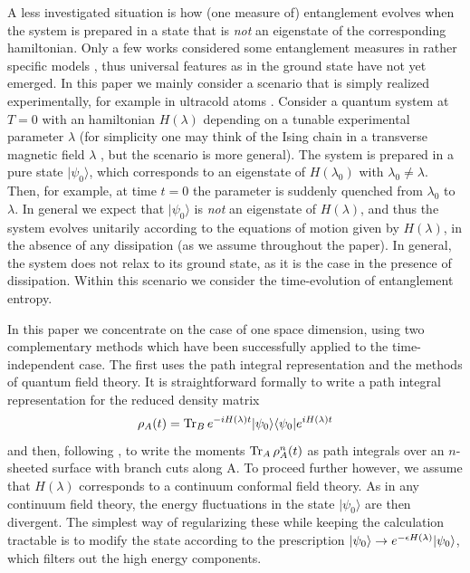 A less investigated situation is how (one measure of) entanglement evolves 
when the system is prepared in a state that is {\em not} an eigenstate of 
the corresponding hamiltonian.
Only a few works considered some entanglement measures in rather specific 
models \cite{outeq,dur}, thus universal features as in the ground state have 
not yet emerged. 
In this paper we mainly consider a scenario that is simply
realized experimentally, for example in ultracold atoms \cite{uc,sps-04}. 
Consider a quantum system at $T=0$ with an hamiltonian $H(\lambda)$ depending 
on a tunable experimental parameter $\lambda$ (for simplicity one may
think of the Ising chain in a transverse magnetic 
field $\lambda$ \cite{sach}, but the scenario is more general).
The system is prepared in a pure state $|\psi_0\rangle$,
which corresponds to an eigenstate of $H(\lambda_0)$ with 
$\lambda_0\neq \lambda$. Then, for example,
at time $t=0$ the parameter is suddenly quenched from 
$\lambda_0$ to $\lambda$. In general we expect that $|\psi_0\rangle$ 
is {\it not} an eigenstate of $H(\lambda)$, and thus the system evolves 
unitarily according to the equations of motion given by $H(\lambda)$, 
in the absence of any dissipation (as we assume throughout  the paper). 
In general, the system does not relax to its ground state,
as it is the case in the presence of dissipation.
Within this scenario we consider the time-evolution of 
entanglement entropy.




In this paper we concentrate on the case of one space dimension, using
two complementary methods which have been successfully applied to the
time-independent case. The first uses the path integral representation
and the methods of quantum field theory. It is straightforward formally to
write a path integral representation for the reduced density matrix
\begin{equation}
\rho_A(t)=
{\rm
Tr}_B\,e^{-iH(\lambda)t}|\psi_0\rangle\langle\psi_0|e^{iH(\lambda)t}
\end{equation}
and then, following \cite{cc-04}, to write the moments 
${\rm Tr}_A\,\rho_A^n(t)$ as path integrals over an $n$-sheeted surface with
branch cuts along A. To proceed further however, we assume that
$H(\lambda)$ corresponds to a continuum conformal field theory. As in
any continuum field theory, the energy fluctuations in the state
$|\psi_0\rangle$ are then divergent. The simplest way of regularizing
these while keeping the calculation tractable is to modify the state
according to the prescription
$|\psi_0\rangle\to e^{-\epsilon H(\lambda)}|\psi_0\rangle$, which
filters out the high energy components. 

